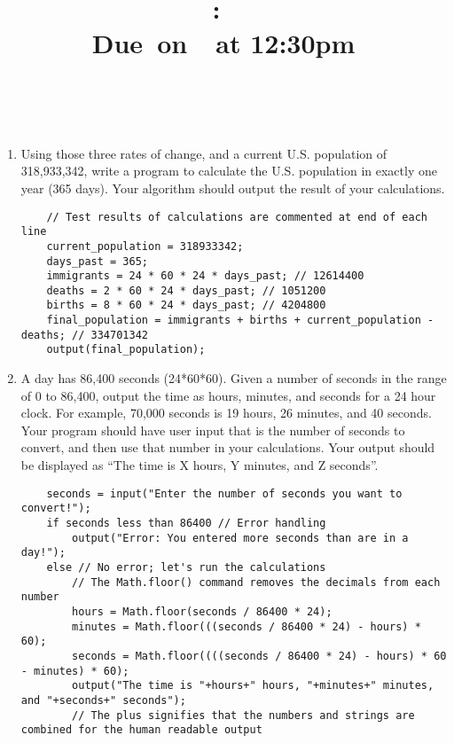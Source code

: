 \documentclass{article}
\title{
    \vspace{2in}
    \textmd{\textbf{\hmwkClass:\ \hmwkTitle}}\\
    \normalsize\vspace{0.1in}\small{Due\ on\ \hmwkDueDate\ at 12:30pm}\\
    \vspace{0.1in}\large{\textit{\hmwkClassInstructor\ \hmwkClassTime}}
    \vspace{3in}
}
\author{\hmwkAuthorName}
\date{}
\begin{document}
\maketitle

\pagebreak




\begin{enumerate}
	\item Using those three rates of change, and a current U.S. population of 318,933,342, write a program to calculate the U.S. population in exactly one year (365 days). Your algorithm should output the result of your calculations.

\begin{lstlisting}
	// Test results of calculations are commented at end of each line
	current_population = 318933342;
	days_past = 365;
	immigrants = 24 * 60 * 24 * days_past; // 12614400
	deaths = 2 * 60 * 24 * days_past; // 1051200
	births = 8 * 60 * 24 * days_past; // 4204800
	final_population = immigrants + births + current_population - deaths; // 334701342
	output(final_population);
\end{lstlisting}
	
	\item A day has 86,400 seconds (24*60*60). Given a number of seconds in the range of 0 to 86,400, output the time as hours, minutes, and seconds for a 24­ hour clock. For example, 70,000 seconds is 19 hours, 26 minutes, and 40 seconds. Your program should have user input that is the number of seconds to convert, and then use that number in your calculations. Your output should be displayed as “The time is X hours, Y minutes, and Z seconds”.

\begin{lstlisting}
	seconds = input("Enter the number of seconds you want to convert!");
	if seconds less than 86400 // Error handling
		output("Error: You entered more seconds than are in a day!");
	else // No error; let's run the calculations
		// The Math.floor() command removes the decimals from each number
		hours = Math.floor(seconds / 86400 * 24); 
		minutes = Math.floor(((seconds / 86400 * 24) - hours) * 60);
		seconds = Math.floor((((seconds / 86400 * 24) - hours) * 60 - minutes) * 60);
		output("The time is "+hours+" hours, "+minutes+" minutes, and "+seconds+" seconds");
		// The plus signifies that the numbers and strings are combined for the human readable output
\end{lstlisting}


\end{enumerate}
\end{document}
